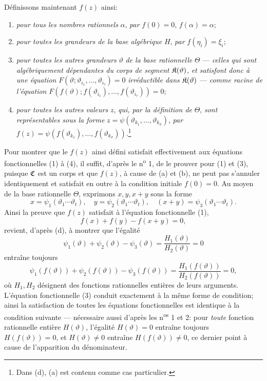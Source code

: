 Définissons maintenant $f(z)$ ainsi:
\begin{enumerate}
\item[(a)] \emph{pour tous les nombres rationnels} $\alpha$, \emph{par} $f(0)=0$, $f(\alpha)=\alpha$;
\item[(b)] \emph{pour toutes les grandeurs de la base algébrique} $H$, \emph{par} $f(\eta_i)=\xi_i$;
\item[(c)] \emph{pour toutes les autres grandeurs} $\vartheta$ \emph{de la base rationnelle} $\Theta$ --- \emph{celles qui sont algébriquement dépendantes du corps de segment} $\mathfrak{K}(\vartheta)$, \emph{et satisfont donc à une équation} $F(\vartheta;\vartheta_{i_1},\ldots,\vartheta_{i_\tau})=0$ \emph{irréductible dans} $\mathfrak{K}(\vartheta)$ --- \emph{comme racine de l'équation} $F(f(\vartheta);f(\vartheta_{i_1}),\ldots,f(\vartheta_{i_\tau}))=0$;
\item[(d)] \emph{pour toutes les autres valeurs} $z$, \emph{qui, par la définition de} $\Theta$, \emph{sont représentables sous la forme} $z=\psi(\vartheta_{k_1},\ldots,\vartheta_{k_\sigma})$, \emph{par} $f(z)=\psi(f(\vartheta_{k_1}),\ldots,f(\vartheta_{k_\sigma}))$.\footnote{Dans (d), (a) est contenu comme cas particulier.}
\end{enumerate}

Pour montrer que le $f(z)$ ainsi défini satisfait effectivement aux équations fonctionnelles (1) à (4), il suffit, d'après le n\textsuperscript{o} 1, de le prouver pour (1) et (3), puisque $\mathfrak{C}$ est un corps et que $f(z)$, à cause de (a) et (b), ne peut pas s'annuler identiquement et satisfait en outre à la condition initiale $f(0)=0$. Au moyen de la base rationnelle $\Theta$, exprimons $x,y,x+y$ sous la forme
\[
x=\psi_1(\vartheta_1\cdots\vartheta_t),\quad
 y=\psi_2(\vartheta_1\cdots\vartheta_t),\quad
 (x+y)=\psi_3(\vartheta_1\cdots\vartheta_t).
\]
Ainsi la preuve que $f(z)$ satisfait à l'équation fonctionnelle (1),
\[
f(x)+f(y)-f(x+y)=0,
\]
revient, d'après (d), à montrer que l'égalité
\[
\psi_1(\vartheta)+\psi_2(\vartheta)-\psi_3(\vartheta)
 =\frac{H_1(\vartheta)}{H_2(\vartheta)}=0
\]
entraîne toujours
\[
\psi_1(f(\vartheta))+\psi_2(f(\vartheta))-\psi_3(f(\vartheta))
 =\frac{H_1(f(\vartheta))}{H_2(f(\vartheta))}=0,
\]
où $H_1,H_2$ désignent des fonctions rationnelles entières de leurs arguments. L'équation fonctionnelle (3) conduit exactement à la même forme de condition; ainsi la satisfaction de toutes les équations fonctionnelles est identique à la condition suivante --- nécessaire aussi d'après les n\textsuperscript{os} 1 et 2: pour \emph{toute} fonction rationnelle entière $H(\vartheta)$, l'égalité $H(\vartheta)=0$ entraîne toujours $H(f(\vartheta))=0$, et $H(\vartheta)\ne0$ entraîne $H(f(\vartheta))\ne0$, ce dernier point à cause de l'apparition du dénominateur.

